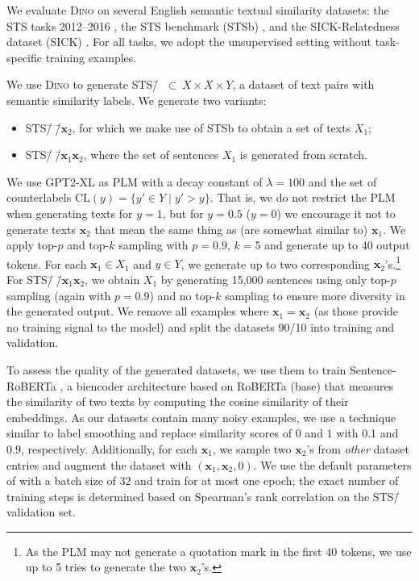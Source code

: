 \documentclass[11pt]{article}
\newcommand\ours{\textsc{Dino}}
\newcommand\ourDs{STS\=/🦕}
\newcommand\ourDsFull{STS\=/🦕\=/$\mathbf{x}_1\mathbf{x}_2$}
\newcommand\ourDsSemi{STS\=/🦕\=/$\mathbf{x}_2$}
\begin{document}
We evaluate \ours{} on several English semantic
textual similarity datasets: the STS tasks 2012--2016 \citep{10.5555/2387636.2387697,agirre-etal-2013-sem,agirre-etal-2014-semeval,agirre-etal-2015-semeval,agirre-etal-2016-semeval},
the STS benchmark (STSb) \citep{cer-etal-2017-semeval}, and
the SICK-Relatedness dataset
(SICK) \citep{marelli-etal-2014-sick}. For all tasks, we
adopt the unsupervised setting without task-specific training examples.

We use \ours{} to generate \ourDs{} ${\subset}\,X \times X \times Y$, a dataset
of text pairs with semantic similarity labels. We generate two variants:
\begin{itemize}[topsep=0.5em]
	\setlength\itemsep{-0.1em}
	\item \ourDsSemi{}, for which we make use of STSb to obtain a set of
	texts $X_1$;
	\item \ourDsFull{}, where the set of sentences $X_1$ is generated from scratch.
\end{itemize}
We use GPT2-XL as PLM with
a decay constant of $\lambda = 100$
and the
set of counterlabels
$\text{CL}(y) = \{ y' \in
Y \mid y' > y \}$. That is, we do not restrict the PLM when generating texts for $y=1$, but for $y=0.5$ ($y=0$) we encourage it not to generate texts $\mathbf{x}_2$ that mean the same thing as (are somewhat similar to) $\mathbf{x}_1$. We apply
top-$p$ \citep{Holtzman2020The} and
top-$k$ \citep{fan-etal-2018-hierarchical,holtzman-etal-2018-learning}
sampling with $p = 0.9$, $k = 5$ and generate up to 40
output tokens. For each $\mathbf{x}_1 \in X_1$ and $y \in
Y$, we generate up to two corresponding
$\mathbf{x}_2$'s.\footnote{As the PLM may not 
generate a quotation mark in the first 40
tokens, we use up to 5 tries to generate the two
$\mathbf{x}_2$'s.}
For \ourDsFull{}, we obtain $X_1$ by generating 15,000 sentences using only top-$p$ sampling (again with $p = 0.9$) and no top-$k$ sampling to ensure more diversity in the generated output.
We remove all examples where $\mathbf{x}_1 = \mathbf{x}_2$ (as those provide no training signal to the model) and 
split the datasets 90/10 into training and validation.

To assess the quality of the generated datasets, we use them to train Sentence-RoBERTa \citep{reimers-gurevych-2019-sentence}, a biencoder architecture based on RoBERTa (base) \citep{liu2019roberta} that measures the similarity of two texts by computing the cosine similarity of their embeddings. 
As our datasets contain many noisy examples, we use a technique similar to label smoothing \citep{szegedy2016rethinking} and replace similarity scores of $0$ and $1$ with $0.1$ and $0.9$, respectively.
Additionally, for each $\mathbf{x}_1$, we sample two
$\mathbf{x}_2$'s from \emph{other} dataset entries and
augment the dataset with $(\mathbf{x}_1, \mathbf{x}_2,
0)$. We use the default parameters
of \citet{reimers-gurevych-2019-sentence} with a batch size
of 32 and train for at most one epoch; the exact number of
training steps is determined based on Spearman's rank correlation on the \ourDs{} validation set.
\end{document}
